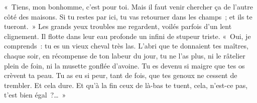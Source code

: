 {«~Tiens, mon bonhomme, c'est pour toi. Mais il faut venir chercher ça de l'autre côté des maisons. Si tu restes par ici, tu vas retourner dans les champs~; et ils te tueront.~» Les grands yeux troubles me regardent, voilés parfois d'un lent clignement. Il flotte dans leur eau profonde un infini de stupeur triste. «~Oui, je comprends~: tu es un vieux cheval très las. L'abri que te donnaient tes maîtres, chaque soir, en récompense de ton labeur du jour, tu ne l'as plus, ni le râtelier plein de foin, ni la musette gonflée d'avoine. Tu es devenu si maigre que tes os crèvent ta peau. Tu as eu si peur, tant de fois, que tes genoux ne cessent de trembler. Et cela dure. Et qu'à la fin ceux de là-bas te tuent, cela, n'est-ce pas, t'est bien égal~?…~»
}


